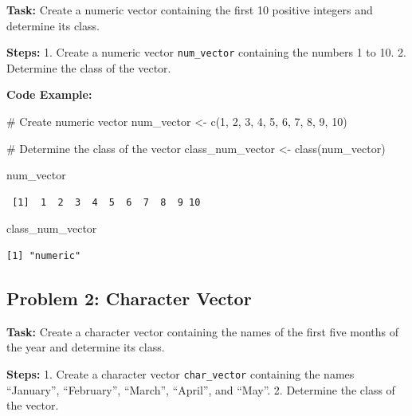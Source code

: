 \documentclass[
  letterpaper,
  DIV=11,
  numbers=noendperiod]{scrreprt}
\newenvironment{Shaded}{\begin{snugshade}}{\end{snugshade}}
\newcommand{\CommentTok}[1]{\textcolor[rgb]{0.37,0.37,0.37}{#1}}
\newcommand{\DecValTok}[1]{\textcolor[rgb]{0.68,0.00,0.00}{#1}}
\newcommand{\FunctionTok}[1]{\textcolor[rgb]{0.28,0.35,0.67}{#1}}
\newcommand{\NormalTok}[1]{\textcolor[rgb]{0.00,0.23,0.31}{#1}}
\newcommand{\OtherTok}[1]{\textcolor[rgb]{0.00,0.23,0.31}{#1}}
\begin{document}
\textbf{Task:} Create a numeric vector containing the first 10 positive
integers and determine its class.

\textbf{Steps:} 1. Create a numeric vector \texttt{num\_vector}
containing the numbers 1 to 10. 2. Determine the class of the vector.

\textbf{Code Example:}

\begin{Shaded}
\begin{Highlighting}[]
\CommentTok{\# Create numeric vector}
\NormalTok{num\_vector }\OtherTok{\textless{}{-}} \FunctionTok{c}\NormalTok{(}\DecValTok{1}\NormalTok{, }\DecValTok{2}\NormalTok{, }\DecValTok{3}\NormalTok{, }\DecValTok{4}\NormalTok{, }\DecValTok{5}\NormalTok{, }\DecValTok{6}\NormalTok{, }\DecValTok{7}\NormalTok{, }\DecValTok{8}\NormalTok{, }\DecValTok{9}\NormalTok{, }\DecValTok{10}\NormalTok{)}

\CommentTok{\# Determine the class of the vector}
\NormalTok{class\_num\_vector }\OtherTok{\textless{}{-}} \FunctionTok{class}\NormalTok{(num\_vector)}

\NormalTok{num\_vector}
\end{Highlighting}
\end{Shaded}

\begin{verbatim}
 [1]  1  2  3  4  5  6  7  8  9 10
\end{verbatim}

\begin{Shaded}
\begin{Highlighting}[]
\NormalTok{class\_num\_vector}
\end{Highlighting}
\end{Shaded}

\begin{verbatim}
[1] "numeric"
\end{verbatim}

\subsection*{Problem 2: Character
Vector}\label{problem-2-character-vector}

\textbf{Task:} Create a character vector containing the names of the
first five months of the year and determine its class.

\textbf{Steps:} 1. Create a character vector \texttt{char\_vector}
containing the names ``January'', ``February'', ``March'', ``April'',
and ``May''. 2. Determine the class of the vector.
\end{document}
